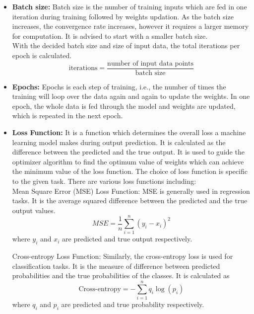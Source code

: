 \begin{itemize}
    \item \textbf{Batch size:} Batch size is the number of training inputs which are fed in one iteration during training followed by weights updation. As the batch size increases, the convergence rate increases, however it requires a larger memory for computation. It is advised to start with a smaller batch size. \\
    With the decided batch size and size of input data, the total iterations per epoch is calculated.
    \begin{equation}
    \text{iterations} = \frac{\text{number of input data points}}{\text{batch size}}        
    \end{equation}
    \item \textbf{Epochs:} Epochs is each step of training, i.e., the number of times the training will loop over the data again and again to update the weights. In one epoch, the whole data is fed through the model and weights are updated, which is repeated in the next epoch. 
    
    \item \textbf{Loss Function:} It is a function which determines the overall loss a machine learning model makes during output prediction. It is calculated as the difference between the predicted and the true output. It is used to guide the optimizer algorithm to find the optimum value of weights which can achieve the minimum value of the loss function. The choice of loss function is specific to the given task. There are various loss functions including: \\
    Mean Square Error (MSE) Loss Function: MSE is generally used in regression tasks. It is the average squared difference between the predicted and the true output values.
    \begin{equation}
    MSE = \frac{1}{n}\sum_{i=1}^{n}(y_i - x_i )^2    
    \end{equation}
    where $y_i$ and $x_i$ are predicted and true output respectively. 

    Cross-entropy Loss Function: Similarly, the cross-entropy loss is used for classification tasks. It is the measure of difference between predicted probabilities and the true probabilities of the classes. It is calculated as
    \begin{equation}
        \text{Cross-entropy} = -\sum_{i=1}^nq_{i}\log(p_{i})
    \end{equation}
    where $q_i$ and $p_i$ are predicted and true probability respectively. 


\end{itemize}
